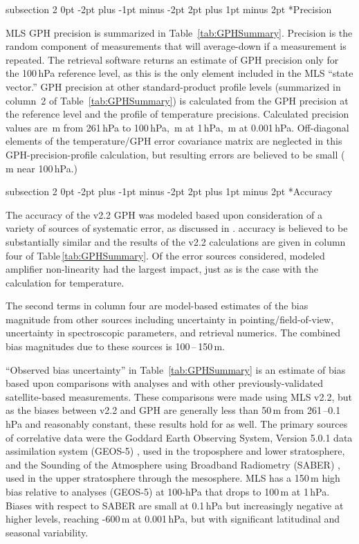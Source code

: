 \documentclass[11pt,draft]{report}
\makeatletter
\renewcommand{\subsection}{\@startsection%
  {subsection}%
  {2}%
  {0pt}%
  {-2pt plus -1pt minus -2pt}%
  {2pt plus 1pt minus 2pt}%
  {\large\sffamily\fontseries{sb}\selectfont\flushleft\color{SectionColor}\figureversion{tabular}}}%
\makeatother
\begin{document}
\subsection*{Precision}

MLS \thisv GPH precision is summarized in Table~\ref{tab:GPHSummary}.
Precision is the random component of measurements that will average-down
if a measurement is repeated.  The retrieval software returns an
estimate of GPH precision only for the 100\,hPa reference level, as this
is the only element included in the MLS ``state vector.''  GPH precision
at other standard-product profile levels (summarized in column~2 of
Table~\ref{tab:GPHSummary}) is calculated from the GPH precision at the
reference level and the profile of temperature precisions.  Calculated
precision values are \,m from 261\,hPa to 100\,hPa,
\,m at 1\,hPa, \,m at 0.001\,hPa.
Off-diagonal elements of the temperature/GPH error covariance matrix are
neglected in this GPH-precision-profile calculation, but resulting
errors are believed to be small (\,m near 100\,hPa.)

\subsection*{Accuracy}

The accuracy of the v2.2 GPH was modeled based upon consideration of a
variety of sources of systematic error, as discussed in
\citet{SchwartzEtal08}. \thisv accuracy is believed to be substantially
similar and the results of the v2.2 calculations are given in column
four of Table\,\ref{tab:GPHSummary}. Of the error sources considered,
modeled amplifier non-linearity had the largest impact, just as is the
case with the calculation for temperature.

The second terms in column four are model-based estimates of the bias
magnitude from other sources including uncertainty in
pointing/field-of-view, uncertainty in spectroscopic parameters, and
retrieval numerics.  The combined bias magnitudes due to these sources
is 100\,--\,150\,m.

``Observed bias uncertainty'' in Table~\ref{tab:GPHSummary} is an
estimate of bias based upon comparisons with analyses and with other
previously-validated satellite-based measurements.  These comparisons
were made using MLS v2.2, but as the biases between v2.2 and \thisv GPH
are generally less than 50\,m from 261\,--0.1\,hPa and reasonably
constant, these results hold for \thisv as well.  The primary sources of
correlative data were the Goddard Earth Observing System, Version 5.0.1
data assimilation system (GEOS-5) \citep{ReineckerEtal07}, used in the
troposphere and lower stratosphere, and the Sounding of the Atmosphere
using Broadband Radiometry (SABER) \citep{MlynczakAndRussell95}, used in
the upper stratosphere through the mesosphere.  MLS has a 150\,m high
bias relative to analyses (GEOS-5) at 100-hPa that drops to 100\,m at
1\,hPa.  Biases with respect to SABER are small at 0.1\,hPa but
increasingly negative at higher levels, reaching -600\,m at 0.001\,hPa,
but with significant latitudinal and seasonal variability.
\end{document}
